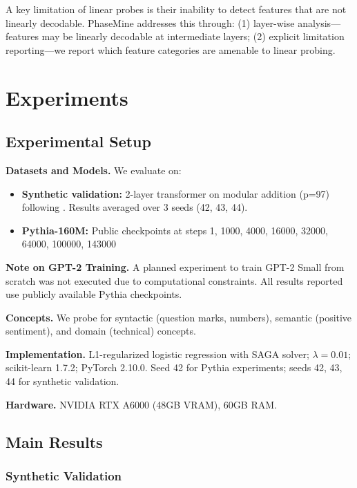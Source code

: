 \documentclass{article}
\begin{document}
A key limitation of linear probes is their inability to detect features that are not linearly decodable. PhaseMine addresses this through: (1) layer-wise analysis---features may be linearly decodable at intermediate layers; (2) explicit limitation reporting---we report which feature categories are amenable to linear probing.

\section{Experiments}

\subsection{Experimental Setup}

\textbf{Datasets and Models.} We evaluate on:
\begin{itemize}
    \item \textbf{Synthetic validation:} 2-layer transformer on modular addition (p=97) following \cite{nanda2023progress}. Results averaged over 3 seeds (42, 43, 44).
    \item \textbf{Pythia-160M:} Public checkpoints at steps 1, 1000, 4000, 16000, 32000, 64000, 100000, 143000 \cite{biderman2023pythia}
\end{itemize}

\textbf{Note on GPT-2 Training.} A planned experiment to train GPT-2 Small from scratch was not executed due to computational constraints. All results reported use publicly available Pythia checkpoints.

\textbf{Concepts.} We probe for syntactic (question marks, numbers), semantic (positive sentiment), and domain (technical) concepts.

\textbf{Implementation.} L1-regularized logistic regression with SAGA solver; $\lambda=0.01$; scikit-learn 1.7.2; PyTorch 2.10.0. Seed 42 for Pythia experiments; seeds 42, 43, 44 for synthetic validation.

\textbf{Hardware.} NVIDIA RTX A6000 (48GB VRAM), 60GB RAM.

\subsection{Main Results}

\subsubsection{Synthetic Validation}
\end{document}

